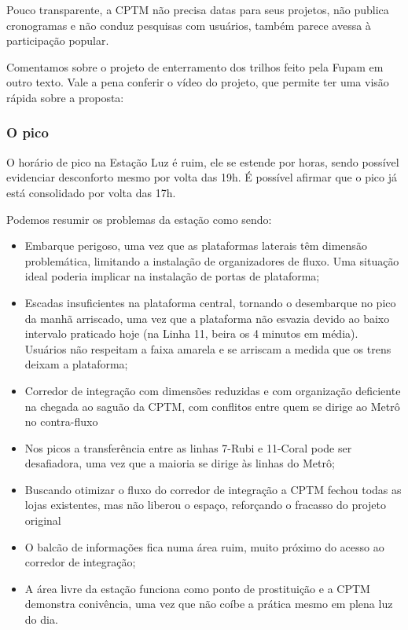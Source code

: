 \documentclass[11pt,fleqn]{book} %
\begin{document}
Pouco transparente, a CPTM não precisa datas para seus projetos, não publica cronogramas e não conduz pesquisas com usuários, também parece avessa à participação popular.

Comentamos sobre o projeto de enterramento dos trilhos feito pela Fupam em outro texto. Vale a pena conferir o vídeo do projeto, que permite ter uma visão rápida sobre a proposta:


\subsubsection{O pico}

O horário de pico na Estação Luz é ruim, ele se estende por horas, sendo possível evidenciar desconforto mesmo por volta das 19h. É possível afirmar que o pico já está consolidado por volta das 17h.

Podemos resumir os problemas da estação como sendo:

\begin{itemize}
	\item Embarque perigoso, uma vez que as plataformas laterais têm dimensão problemática, limitando a instalação de organizadores de fluxo. Uma situação ideal poderia implicar na instalação de portas de plataforma;
	\item Escadas insuficientes na plataforma central, tornando o desembarque no pico da manhã arriscado, uma vez que a plataforma não esvazia devido ao baixo intervalo praticado hoje (na Linha 11, beira os 4 minutos em média). Usuários não respeitam a faixa amarela e se arriscam a medida que os trens deixam a plataforma;
	\item Corredor de integração com dimensões reduzidas e com organização deficiente na chegada ao saguão da CPTM, com conflitos entre quem se dirige ao Metrô no contra-fluxo
	\item Nos picos a transferência entre as linhas 7-Rubi e 11-Coral pode ser desafiadora, uma vez que a maioria se dirige às linhas do Metrô;
	\item Buscando otimizar o fluxo do corredor de integração a CPTM fechou todas as lojas existentes, mas não liberou o espaço, reforçando o fracasso do projeto original
	\item O balcão de informações fica numa área ruim, muito próximo do acesso ao corredor de integração;
	\item A área livre da estação funciona como ponto de prostituição e a CPTM demonstra conivência, uma vez que não coíbe a prática mesmo em plena luz do dia.
\end{itemize}
\end{document}

